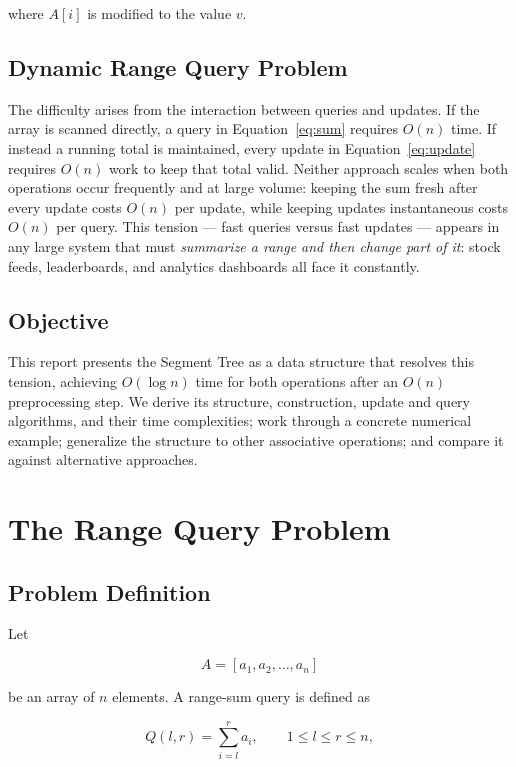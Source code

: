 \documentclass[11pt]{scrartcl}
\begin{document}
where $A[i]$ is modified to the value $v$.

\subsection{Dynamic Range Query Problem}
The difficulty arises from the interaction between queries and updates. If the array is scanned directly, a query in Equation~\eqref{eq:sum} requires $O(n)$ time. If instead a running total is maintained, every update in Equation~\eqref{eq:update} requires $O(n)$ work to keep that total valid. Neither approach scales when both operations occur frequently and at large volume: keeping the sum fresh after every update costs $O(n)$ per update, while keeping updates instantaneous costs $O(n)$ per query. This tension --- fast queries versus fast updates --- appears in any large system that must \emph{summarize a range and then change part of it}: stock feeds, leaderboards, and analytics dashboards all face it constantly.

\subsection{Objective}
This report presents the Segment Tree as a data structure that resolves this tension, achieving $O(\log n)$ time for both operations after an $O(n)$ preprocessing step. We derive its structure, construction, update and query algorithms, and their time complexities; work through a concrete numerical example; generalize the structure to other associative operations; and compare it against alternative approaches.

\section{The Range Query Problem}

\subsection{Problem Definition}
Let

\begin{equation}
A = [a_1, a_2, \ldots, a_n]
\end{equation}

be an array of $n$ elements. A range-sum query is defined as

\begin{equation}
Q(l,r) = \sum_{i=l}^{r} a_i, \qquad 1 \le l \le r \le n,
\end{equation}
\end{document}
